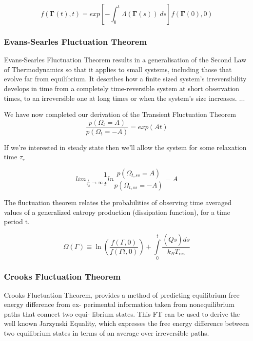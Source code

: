 \documentclass[a4paper,12pt,nofootinbib]{article}
\begin{document}
\begin{equation}
  f(\bm{\Gamma}(t),t)= exp[- \int_0^t \Lambda(\bm{\Gamma}(s))\ ds ]f(\bm{\Gamma}(0),0)
\end{equation}



\subsubsection{Evans-Searles Fluctuation Theorem}
Evans-Searles Fluctuation Theorem results in a generalisation of the Second Law of Thermodynamics so that it applies to small systems, including those that evolve far from equilibrium.
It describes how a finite sized system's irreversibility develops in time from a completely time-reversible system at short observation times, to an irreversible one at long times or when the system's size increases. 
...

We have now completed our derivation of the Transient Fluctuation Theorem
\begin{displaymath}
  \frac{p(\Omega_t=A)}{p(\Omega_t=-A)}=exp(A t)
\end{displaymath}


If we're interested in steady state then we'll allow the system for some relaxation time $\tau_r$

\begin{displaymath}
  lim_{\frac{t}{\tau_R}\rightarrow \infty} \frac{1}{t} ln{\frac{p(\Omega_{t,ss}=A)}{p(\Omega_{t,ss}=-A)}} =A
\end{displaymath}


The fluctuation theorem relates the probabilities of observing time averaged values of a generalized entropy production (dissipation function), for a time period t.

\begin{displaymath}
  \Omega(\Gamma) \equiv \ln \left(\frac{f(\Gamma ,0)}{f(\Gamma  t,0)}\right)+\underset{0}{\overset{t}{\int }}\frac{\left(\dot{Q} s\right) ds}{k_B T_{\text{res}}}
\end{displaymath}

\subsubsection{Crooks Fluctuation Theorem}

Crooks Fluctuation Theorem, provides a method of predicting equilibrium free energy difference from ex- perimental information taken from nonequilibrium paths that connect two equi- librium states. This FT can be used to derive the well known Jarzynski Equality, which expresses the free energy difference between two equilibrium states in terms of an average over irreversible paths.
\end{document}
